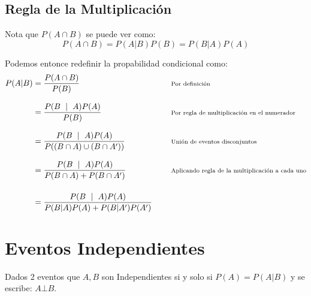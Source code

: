 \documentclass[12pt, fleqn]{report}                             %
\DeclareMathOperator \Space {\quad}                             %
\DeclareMathOperator \MiniSpace {\;}                            %
\newcommand \Such {\MiniSpace | \MiniSpace}                     %
\newcommand \Remember[1]{\Space\text{\scriptsize{#1}}}          %
\theoremstyle{break}                                            %
\begin{document}
            \subsection{Regla de la Multiplicación}

                Nota que $P(A \cap B)$ se puede ver como:
                \begin{equation*}
                    P(A \cap B)
                        = P(A | B)P(B)
                        = P(B | A)P(A) 
                \end{equation*}


                Podemos entonce redefinir la propabilidad condicional como:
                \begin{align*}
                    P(A | B)
                        &= \dfrac{P(A \cap B)}{P(B)}
                            && \Remember{Por definición}                                    \\[0.8em]
                        &= \dfrac{P(B \Such A)P(A)}{P(B)}
                            && \Remember{Por regla de multiplicación en el numerador}       \\[0.8em]
                        &= \dfrac{P(B \Such A)P(A)}{P((B \cap A) \cup (B \cap A'))}
                            && \Remember{Unión de eventos disconjuntos}                     \\[0.8em]
                        &= \dfrac{P(B \Such A)P(A)}{P(B \cap A) + P(B \cap A')}
                            && \Remember{Aplicando regla de la multiplicación a cada uno}   \\[1.2em]
                        &= \dfrac{P(B \Such A)P(A)}{P(B | A)P(A) + P(B | A')P(A')}
                \end{align*}




        \clearpage
        \section{Eventos Independientes}

            Dados 2 eventos que $A, B$ son Independientes si y solo si
            $P(A) = P(A | B)$ y se escribe: $A \bot B$.


\end{document}

